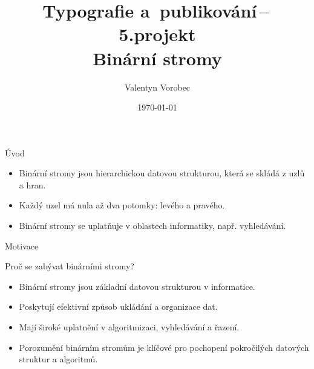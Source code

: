 \documentclass{beamer}
\title{Typografie a~publikování\,--\,5.projekt\\
Binární stromy}
\author{Valentyn Vorobec}
\date{\today}
\begin{document}
\begin{frame}
    \titlepage
\end{frame}

\begin{frame}{Úvod}
    \begin{itemize}
        \item Binární stromy jsou hierarchickou datovou strukturou, která se skládá z uzlů a hran.
        \item Každý uzel má nula až dva potomky: levého a pravého.
        \item Binární stromy se uplatňuje v oblastech informatiky, např. vyhledávání.
    \end{itemize}
\end{frame}

\begin{frame}{Motivace}
    \begin{center}
        \huge Proč se zabývat binárními stromy?
    \end{center}
    \vspace{1em}
    \begin{itemize}
        \item Binární stromy jsou základní datovou strukturou v informatice.
        \item Poskytují efektivní způsob ukládání a organizace dat.
        \item Mají široké uplatnění v algoritmizaci, vyhledávání a řazení.
        \item Porozumění binárním stromům je klíčové pro pochopení pokročilých datových struktur a algoritmů.
    \end{itemize}
\end{frame}
\end{document}

